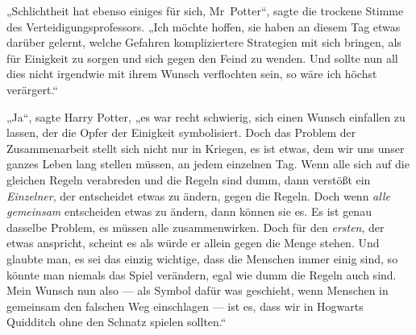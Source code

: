 „Schlichtheit hat ebenso einiges für sich, Mr~Potter“, sagte die trockene Stimme des Verteidigungsprofessors.
„Ich möchte hoffen, sie haben an diesem Tag etwas darüber gelernt, welche Gefahren kompliziertere Strategien mit sich bringen, als für Einigkeit zu sorgen und sich gegen den Feind zu wenden. Und sollte nun all dies nicht irgendwie mit ihrem Wunsch verflochten sein, so wäre ich höchst verärgert.“

„Ja“, sagte Harry Potter, „es war recht schwierig, sich einen Wunsch einfallen zu lassen, der die Opfer der Einigkeit symbolisiert. Doch das Problem der Zusammenarbeit stellt sich nicht nur in Kriegen, es ist etwas, dem wir uns unser ganzes Leben lang stellen müssen, an jedem einzelnen Tag. Wenn alle sich auf die gleichen Regeln verabreden und die Regeln sind dumm, dann verstößt ein \emph{Einzelner}, der entscheidet etwas zu ändern, gegen die Regeln. Doch wenn \emph{alle gemeinsam} entscheiden etwas zu ändern, dann können sie es. Es ist genau dasselbe Problem, es müssen alle zusammenwirken. Doch für den \emph{ersten}, der etwas anspricht, scheint es als würde er allein gegen die Menge stehen. Und glaubte man, es sei das einzig wichtige, dass die Menschen immer einig sind, so könnte man niemals das Spiel verändern, egal wie dumm die Regeln auch sind. Mein Wunsch nun also — als Symbol dafür was geschieht, wenn Menschen in gemeinsam den falschen Weg einschlagen — ist es, dass wir in Hogwarts Quidditch ohne den Schnatz spielen sollten.“

